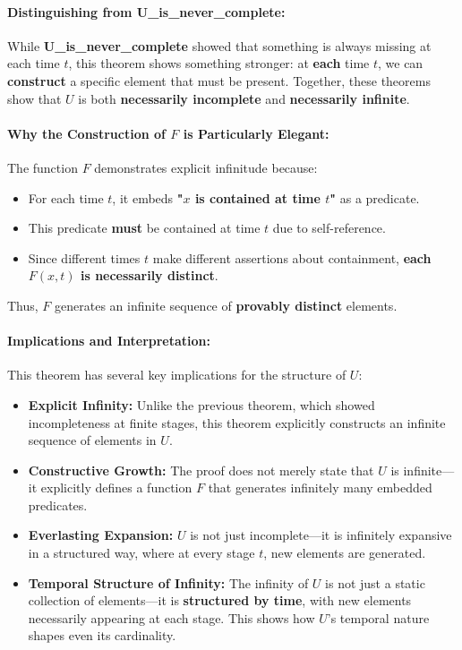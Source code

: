 \documentclass[12pt]{article}
\begin{document}
\paragraph{Distinguishing from U\_is\_never\_complete:}
While \textbf{U\_is\_never\_complete} showed that something is always missing at each time \( t \), this theorem shows something stronger: at \textbf{each} time \( t \), we can \textbf{construct} a specific element that must be present. Together, these theorems show that \( U \) is both \textbf{necessarily incomplete} and \textbf{necessarily infinite}.

\paragraph{Why the Construction of \( F \) is Particularly Elegant:}
The function \( F \) demonstrates explicit infinitude because:
\begin{itemize}
    \item For each time \( t \), it embeds \textbf{"\( x \) is contained at time \( t \)"} as a predicate.
    \item This predicate \textbf{must} be contained at time \( t \) due to self-reference.
    \item Since different times \( t \) make different assertions about containment, \textbf{each \( F(x, t) \) is necessarily distinct}. 
\end{itemize}
Thus, \( F \) generates an infinite sequence of \textbf{provably distinct} elements.

\paragraph{Implications and Interpretation:}
This theorem has several key implications for the structure of \( U \):

\begin{itemize}
    \item \textbf{Explicit Infinity:} Unlike the previous theorem, which showed incompleteness at finite stages, this theorem explicitly constructs an infinite sequence of elements in \( U \).
    \item \textbf{Constructive Growth:} The proof does not merely state that \( U \) is infinite—it explicitly defines a function \( F \) that generates infinitely many embedded predicates.
    \item \textbf{Everlasting Expansion:} \( U \) is not just incomplete—it is infinitely expansive in a structured way, where at every stage \( t \), new elements are generated.
    \item \textbf{Temporal Structure of Infinity:} The infinity of \( U \) is not just a static collection of elements—it is \textbf{structured by time}, with new elements necessarily appearing at each stage. This shows how \( U \)'s temporal nature shapes even its cardinality.
\end{itemize}
\end{document}
